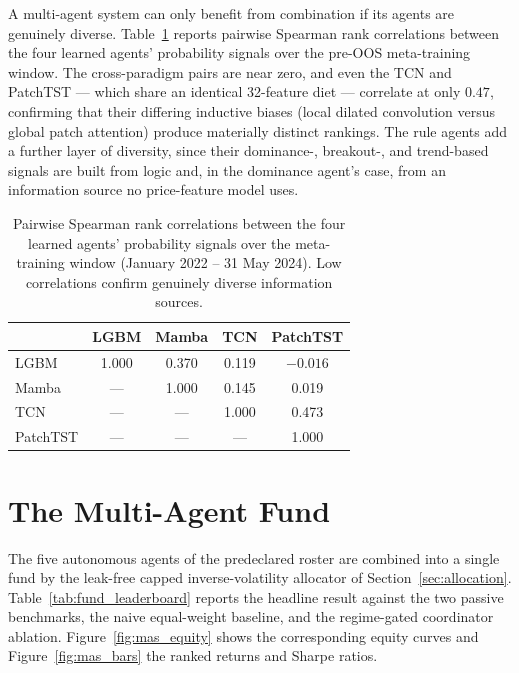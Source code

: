 A multi-agent system can only benefit from combination if its agents are genuinely diverse. Table~\ref{tab:spearman_corr} reports pairwise Spearman rank correlations between the four learned agents' probability signals over the pre-OOS meta-training window. The cross-paradigm pairs are near zero, and even the TCN and PatchTST --- which share an identical 32-feature diet --- correlate at only $0.47$, confirming that their differing inductive biases (local dilated convolution versus global patch attention) produce materially distinct rankings. The rule agents add a further layer of diversity, since their dominance-, breakout-, and trend-based signals are built from logic and, in the dominance agent's case, from an information source no price-feature model uses.

\begin{table}[h!]
    \centering
    \caption{Pairwise Spearman rank correlations between the four learned agents' probability signals over the meta-training window (January 2022 -- 31 May 2024). Low correlations confirm genuinely diverse information sources.}
    \label{tab:spearman_corr}
    \begin{tabular}{lcccc}
        \toprule
        & \textbf{LGBM} & \textbf{Mamba} & \textbf{TCN} & \textbf{PatchTST} \\
        \midrule
        LGBM     & 1.000 & 0.370 & 0.119 & $-0.016$ \\
        Mamba    & ---   & 1.000 & 0.145 & 0.019 \\
        TCN      & ---   & ---   & 1.000 & 0.473 \\
        PatchTST & ---   & ---   & ---   & 1.000 \\
        \bottomrule
    \end{tabular}
\end{table}

\section{The Multi-Agent Fund}
\label{sec:multi_agent}

The five autonomous agents of the predeclared roster are combined into a single fund by the leak-free capped inverse-volatility allocator of Section~\ref{sec:allocation}. Table~\ref{tab:fund_leaderboard} reports the headline result against the two passive benchmarks, the naive equal-weight baseline, and the regime-gated coordinator ablation. Figure~\ref{fig:mas_equity} shows the corresponding equity curves and Figure~\ref{fig:mas_bars} the ranked returns and Sharpe ratios.

